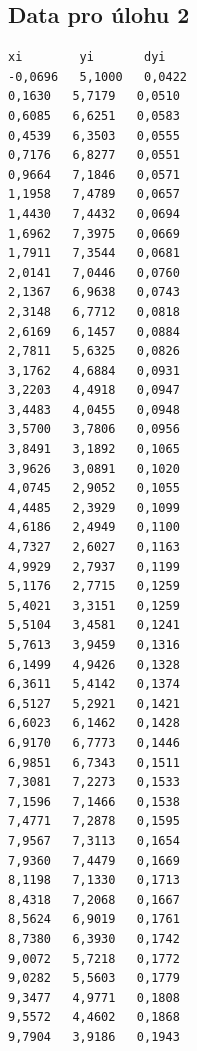 \documentclass[12pt]{article}
\begin{document}
\subsection{Data pro úlohu 2}
\begin{verbatim}
xi	      yi       dyi
-0,0696   5,1000   0,0422
0,1630   5,7179   0,0510
0,6085   6,6251   0,0583
0,4539   6,3503   0,0555
0,7176   6,8277   0,0551
0,9664   7,1846   0,0571
1,1958   7,4789   0,0657
1,4430   7,4432   0,0694
1,6962   7,3975   0,0669
1,7911   7,3544   0,0681
2,0141   7,0446   0,0760
2,1367   6,9638   0,0743
2,3148   6,7712   0,0818
2,6169   6,1457   0,0884
2,7811   5,6325   0,0826
3,1762   4,6884   0,0931
3,2203   4,4918   0,0947
3,4483   4,0455   0,0948
3,5700   3,7806   0,0956
3,8491   3,1892   0,1065
3,9626   3,0891   0,1020
4,0745   2,9052   0,1055
4,4485   2,3929   0,1099
4,6186   2,4949   0,1100
4,7327   2,6027   0,1163
4,9929   2,7937   0,1199
5,1176   2,7715   0,1259
5,4021   3,3151   0,1259
5,5104   3,4581   0,1241
5,7613   3,9459   0,1316
6,1499   4,9426   0,1328
6,3611   5,4142   0,1374
6,5127   5,2921   0,1421
6,6023   6,1462   0,1428
6,9170   6,7773   0,1446
6,9851   6,7343   0,1511
7,3081   7,2273   0,1533
7,1596   7,1466   0,1538
7,4771   7,2878   0,1595
7,9567   7,3113   0,1654
7,9360   7,4479   0,1669
8,1198   7,1330   0,1713
8,4318   7,2068   0,1667
8,5624   6,9019   0,1761
8,7380   6,3930   0,1742
9,0072   5,7218   0,1772
9,0282   5,5603   0,1779
9,3477   4,9771   0,1808
9,5572   4,4602   0,1868
9,7904   3,9186   0,1943
\end{verbatim}
\end{document}
